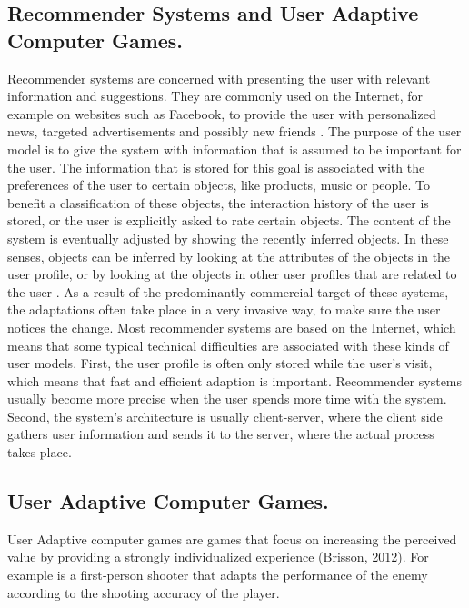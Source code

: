 \subsection{Recommender Systems and User Adaptive Computer Games.}

Recommender systems are concerned with presenting the user with relevant
information and suggestions. They are commonly used on the Internet, for example
on websites such as Facebook, to provide the user with personalized news,
targeted advertisements and possibly new friends \cite{brun2010compass}. The
purpose of the user model is to give the system with information that is assumed
to be important for the user. The information that is stored for this goal is
associated with the preferences of the user to certain objects, like products,
music or people. To benefit a classification of these objects, the interaction
history of the user is stored, or the user is explicitly asked to rate certain
objects. The content of the system is eventually adjusted by showing the
recently inferred objects. In these senses, objects can be inferred by looking
at the attributes of the objects in the user profile, or by looking at the
objects in other user profiles that are related to the user \cite{kobsa2001generic}
\cite{kay2012coming}. As a result of the predominantly commercial target of these
systems, the adaptations often take place in a very invasive way, to make sure
the user notices the change. Most recommender systems are based on the Internet,
which means that some typical technical difficulties  are associated with these
kinds of user models. First, the user profile is often only stored while the
user’s visit,  which means that fast and efficient adaption is important.
Recommender systems usually become more precise  when the user spends more time
with the system. Second, the system’s architecture is usually client-server,
where the client side gathers user information and sends it to the server, where
the  actual process takes place.

\subsection{User Adaptive Computer Games.}

User Adaptive computer games are games that focus on increasing the perceived
value by providing a strongly individualized experience (Brisson, 2012).  For
example is a first‐person shooter that adapts the performance of the enemy
according to the shooting accuracy of the player.

